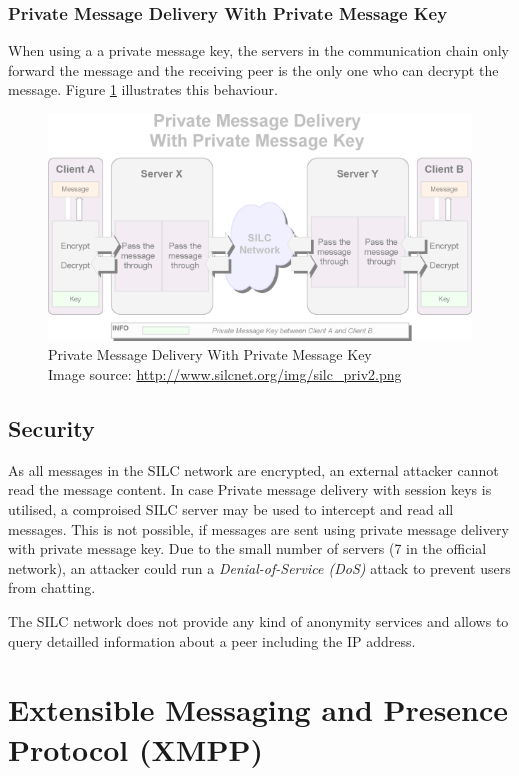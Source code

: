 \subsubsection{Private Message Delivery With Private Message Key}
When using a a private message key, the servers in the communication chain
only forward the message and the receiving peer is the only one who can
decrypt the message. Figure \ref{silcprivkey} illustrates this behaviour.
\begin{figure}
    \centering
    \caption[Silc: Private Message Delivery With Private Message Key]{Private Message Delivery With Private Message Key\\Image source: \protect\url{http://www.silcnet.org/img/silc_priv2.png}}
    \label{silcprivkey}
    \includegraphics[scale=0.8]{silc_priv2.png}
\end{figure}
\subsection{Security}
As all messages in the SILC network are encrypted, an external attacker
cannot read the message content. In case Private message delivery with session keys
is utilised, a comproised SILC server may be used to intercept and read all
messages. This is not possible, if messages are sent using
private message delivery with private message key.
Due to the small number of servers (7 in the official network),
an attacker could run a \textit{Denial-of-Service (DoS)} attack to prevent
users from chatting.

The SILC network does not provide any kind of anonymity services and allows
to query detailled information about a peer including the IP address.
\section{Extensible Messaging and Presence Protocol (XMPP)}
